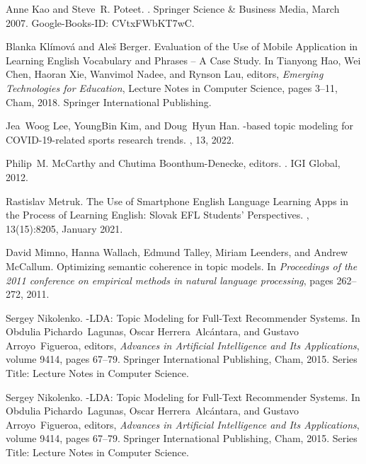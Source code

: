 \begin{thebibliography}{10}
Anne Kao and Steve~R. Poteet.
.
\newblock Springer Science \& Business Media, March 2007.
\newblock Google-Books-ID: CVtxFWbKT7wC.

Blanka Klímová and Aleš Berger.
\newblock Evaluation of the {Use} of {Mobile} {Application} in {Learning}
  {English} {Vocabulary} and {Phrases} – {A} {Case} {Study}.
\newblock In Tianyong Hao, Wei Chen, Haoran Xie, Wanvimol Nadee, and Rynson
  Lau, editors, {\em Emerging {Technologies} for {Education}}, Lecture {Notes}
  in {Computer} {Science}, pages 3--11, Cham, 2018. Springer International
  Publishing.

Jea~Woog Lee, YoungBin Kim, and Doug~Hyun Han.
-based topic modeling for {COVID}-19-related sports research
  trends.
, 13, 2022.

Philip~M. McCarthy and Chutima Boonthum-Denecke, editors.
.
\newblock IGI Global, 2012.

Rastislav Metruk.
\newblock The {Use} of {Smartphone} {English} {Language} {Learning} {Apps} in
  the {Process} of {Learning} {English}: {Slovak} {EFL} {Students}’
  {Perspectives}.
, 13(15):8205, January 2021.

David Mimno, Hanna Wallach, Edmund Talley, Miriam Leenders, and Andrew
  McCallum.
\newblock Optimizing semantic coherence in topic models.
\newblock In {\em Proceedings of the 2011 conference on empirical methods in
  natural language processing}, pages 262--272, 2011.

Sergey Nikolenko.
-{LDA}: {Topic} {Modeling} for {Full}-{Text} {Recommender}
  {Systems}.
\newblock In Obdulia Pichardo~Lagunas, Oscar Herrera~Alcántara, and Gustavo
  Arroyo~Figueroa, editors, {\em Advances in {Artificial} {Intelligence} and
  {Its} {Applications}}, volume 9414, pages 67--79. Springer International
  Publishing, Cham, 2015.
\newblock Series Title: Lecture Notes in Computer Science.

Sergey Nikolenko.
-{LDA}: {Topic} {Modeling} for {Full}-{Text} {Recommender}
  {Systems}.
\newblock In Obdulia Pichardo~Lagunas, Oscar Herrera~Alcántara, and Gustavo
  Arroyo~Figueroa, editors, {\em Advances in {Artificial} {Intelligence} and
  {Its} {Applications}}, volume 9414, pages 67--79. Springer International
  Publishing, Cham, 2015.
\newblock Series Title: Lecture Notes in Computer Science.


\end{thebibliography}
